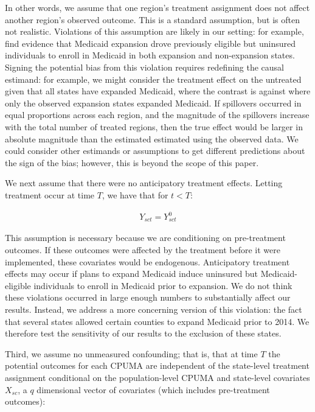 \documentclass[aoas]{imsart}
\theoremstyle{plain}
\theoremstyle{remark}
\begin{document}
In other words, we assume that one region's treatment assignment does not affect another region's observed outcome. This is a standard assumption, but is often not realistic. Violations of this assumption are likely in our setting: for example, \cite{frean2017premium} find evidence that Medicaid expansion drove previously eligible but uninsured individuals to enroll in Medicaid in both expansion and non-expansion states. Signing the potential bias from this violation requires redefining the causal estimand: for example, we might consider the treatment effect on the untreated given that all states have expanded Medicaid, where the contrast is against where only the observed expansion states expanded Medicaid. If spillovers occurred in equal proportions across each region, and the magnitude of the spillovers increase with the total number of treated regions, then the true effect would be larger in absolute magnitude than the estimated estimated using the observed data. We could consider other estimands or assumptions to get different predictions about the sign of the bias; however, this is beyond the scope of this paper.

We next assume that there were no anticipatory treatment effects. Letting treatment occur at time $T$, we have that for $t < T$:

\begin{align*}
Y_{sct} = Y_{sct}^0
\end{align*}

This assumption is necessary because we are conditioning on pre-treatment outcomes. If these outcomes were affected by the treatment before it were implemented, these covariates would be endogenous. Anticipatory treatment effects may occur if plans to expand Medicaid induce uninsured but Medicaid-eligible individuals to enroll in Medicaid prior to expansion. We do not think these violations occurred in large enough numbers to substantially affect our results. Instead, we address a more concerning version of this violation: the fact that several states allowed certain counties to expand Medicaid prior to 2014. We therefore test the sensitivity of our results to the exclusion of these states.

Third, we assume no unmeasured confounding; that is, that at time $T$ the potential outcomes for each CPUMA are independent of the state-level treatment assignment conditional on the population-level CPUMA and state-level covariates $X_{sc}$, a $q$ dimensional vector of covariates (which includes pre-treatment outcomes):
\end{document}
